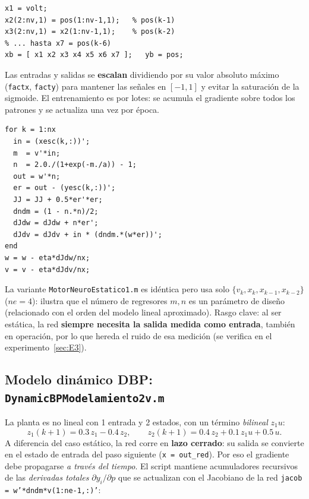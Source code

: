 \documentclass[11pt,a4paper]{article}
\newcommand{\code}[1]{\texttt{\small #1}}
\begin{document}
\begin{lstlisting}[caption={Regresores (valores pasados): voltaje actual + 6 posiciones pasadas (\texttt{ne}=7).}]
x1 = volt;
x2(2:nv,1) = pos(1:nv-1,1);   % pos(k-1)
x3(2:nv,1) = x2(1:nv-1,1);    % pos(k-2)
% ... hasta x7 = pos(k-6)
xb = [ x1 x2 x3 x4 x5 x6 x7 ];   yb = pos;
\end{lstlisting}

Las entradas y salidas se \textbf{escalan} dividiendo por su valor absoluto máximo
(\code{factx}, \code{facty}) para mantener las señales en $[-1,1]$ y evitar la saturación
de la sigmoide. El entrenamiento es por lotes: se acumula el gradiente sobre
todos los patrones y se actualiza una vez por época.

\begin{lstlisting}[caption={Núcleo del entrenamiento estático (retropropagación estándar).}]
for k = 1:nx
  in = (xesc(k,:))';
  m  = v'*in;
  n  = 2.0./(1+exp(-m./a)) - 1;
  out = w'*n;
  er = out - (yesc(k,:))';
  JJ = JJ + 0.5*er'*er;
  dndm = (1 - n.*n)/2;
  dJdw = dJdw + n*er';
  dJdv = dJdv + in * (dndm.*(w*er))';
end
w = w - eta*dJdw/nx;
v = v - eta*dJdv/nx;
\end{lstlisting}

La variante \code{MotorNeuroEstatico1.m} es idéntica pero usa solo
$\{v_k, x_k, x_{k-1}, x_{k-2}\}$ ($ne=4$): ilustra que el número de regresores
$m,n$ es un parámetro de diseño (relacionado con el orden del modelo lineal aproximado).
Rasgo clave: al ser estática, la red \textbf{siempre necesita la salida medida como
entrada}, también en operación, por lo que hereda el ruido de esa medición
(se verifica en el experimento~\ref{sec:E3}).

\subsection{Modelo dinámico DBP: \texttt{DynamicBPModelamiento2v.m}}

La planta es no lineal con 1 entrada y 2 estados, con un término \emph{bilineal}
$z_1 u$:
\[
  z_1(k{+}1)=0.3\,z_1-0.4\,z_2,\qquad
  z_2(k{+}1)=0.4\,z_2+0.1\,z_1 u+0.5\,u .
\]
A diferencia del caso estático, la red corre en \textbf{lazo cerrado}: su salida se
convierte en el estado de entrada del paso siguiente (\code{x = out\_red}). Por eso el
gradiente debe propagarse \emph{a través del tiempo}. El script mantiene acumuladores
recursivos de las \emph{derivadas totales} $\partial y_i/\partial p$ que se actualizan
con el Jacobiano de la red \code{jacob = w'*dndm*v(1:ne-1,:)'}:
\end{document}
